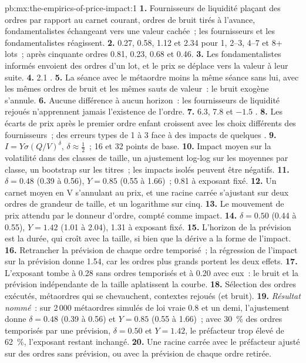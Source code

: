 \begin{solution}{pb:mx:the-empirics-of-price-impact:1}
\textbf{1.} Fournisseurs de liquidité plaçant des ordres par rapport au carnet courant, ordres de bruit tirés à l'avance, fondamentalistes échangeant vers une valeur cachée~; les fournisseurs et les
fondamentalistes réagissent.
\textbf{2.} 0.27, 0.58, 1.12 et 2.34  pour 1, 2--3, 4--7 et 8+ lots~; après cinquante ordres 0.81, 0.23, 0.68 et 0.46.
\textbf{3.} Les fondamentalistes informés envoient des ordres d'un lot, et le prix se déplace vers la valeur à leur suite.
\textbf{4.} 2.1 .
\textbf{5.} La séance avec le métaordre moins la même séance sans lui, avec les mêmes ordres de bruit et les mêmes sauts de valeur~: le bruit exogène s'annule.
\textbf{6.} Aucune différence à aucun horizon~: les fournisseurs de liquidité rejoués n'apprennent jamais l'existence de l'ordre.
\textbf{7.} 6.3, 7.8 et $-1.5$ .
\textbf{8.} Les écarts de prix après le premier ordre enfant croissent avec les choix différents des fournisseurs~; des erreurs types de 1 à 3  face à des impacts de quelques
.
\textbf{9.} $I=Y\sigma(Q/V)^\delta$, $\delta\approx\tfrac12$~; 16 et 32 points de base.
\textbf{10.} Impact moyen sur la volatilité dans des classes de taille, un ajustement log-log sur les moyennes par classe, un bootstrap sur les titres~; les impacts isolés peuvent être négatifs.
\textbf{11.} $\delta=0.48$ (0.39 à 0.56), $Y=0.85$ (0.55 à 1.66)~; 0.81 à exposant fixé.
\textbf{12.} Un carnet moyen en V s'annulant au prix, et une racine carrée s'ajustant sur deux ordres de grandeur de taille, et un logarithme sur cinq.
\textbf{13.} Le mouvement de prix attendu par le donneur d'ordre, compté comme impact.
\textbf{14.} $\delta=0.50$ (0.44 à 0.55), $Y=1.42$ (1.01 à 2.04), 1.31 à exposant fixé.
\textbf{15.} L'horizon de la prévision est la durée, qui croît avec la taille, si bien que la dérive a la forme de l'impact.
\textbf{16.} Retrancher la prévision de chaque ordre temporisé~; la régression de l'impact sur la prévision donne 1.54, car les ordres plus grands portent les deux effets.
\textbf{17.} L'exposant tombe à 0.28 sans ordres temporisés et à 0.20 avec eux~: le bruit et la prévision indépendante de la taille aplatissent la courbe.
\textbf{18.} Sélection des ordres exécutés, métaordres qui se chevauchent, contextes rejoués (et bruit).
\textbf{19.} \emph{Résultat nommé}~: sur 2\,000 métaordres simulés de loi vraie 0.8 et un demi, l'ajustement donne $\delta=0.48$ (0.39 à 0.56) et $Y=0.85$ (0.55
à 1.66)~; avec 30~\% des ordres temporisés par une prévision, $\delta=0.50$ et $Y=1.42$, le préfacteur trop élevé de 62~\%, l'exposant restant inchangé.
\textbf{20.} Une racine carrée avec le préfacteur ajusté sur des ordres sans prévision, ou avec la prévision de chaque ordre retirée.
\end{solution}

